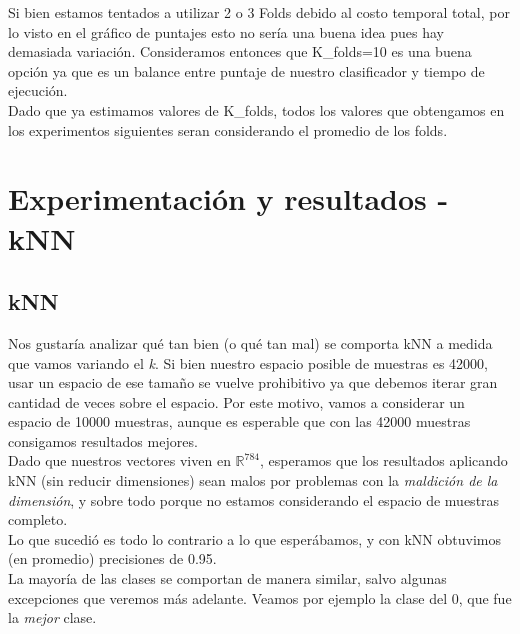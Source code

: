 Si bien estamos tentados a utilizar 2 o 3 Folds debido al costo temporal total, por lo visto en el gráfico de puntajes esto no sería una buena idea pues hay demasiada variación. Consideramos entonces que K_folds=10 es una buena opción ya que es un balance entre puntaje de nuestro clasificador y tiempo de ejecución. \\

Dado que ya estimamos valores de K_folds, todos los valores que obtengamos en los experimentos siguientes seran considerando el promedio de los folds.


\newpage
\section{Experimentación y resultados - kNN}

\subsection{kNN}

Nos gustaría analizar qué tan bien (o qué tan mal) se comporta kNN a medida que vamos variando el \textit{k}. Si bien nuestro espacio posible de muestras es 42000, usar un espacio de ese tamaño se vuelve prohibitivo ya que debemos iterar gran cantidad de veces sobre el espacio. Por este motivo, vamos a considerar un espacio de 10000 muestras, aunque es esperable que con las 42000 muestras consigamos resultados mejores. \\

Dado que nuestros vectores viven en $\mathbb{R}^{784}$, esperamos que los resultados aplicando kNN (sin reducir dimensiones) sean malos por problemas con la \textit{maldición de la dimensión}, y sobre todo porque no estamos considerando el espacio de muestras completo. \\

Lo que sucedió es todo lo contrario a lo que esperábamos, y con kNN obtuvimos (en promedio) precisiones de 0.95. \\

La mayoría de las clases se comportan de manera similar, salvo algunas excepciones que veremos más adelante. Veamos por ejemplo la clase del 0, que fue la \textit{mejor} clase.

